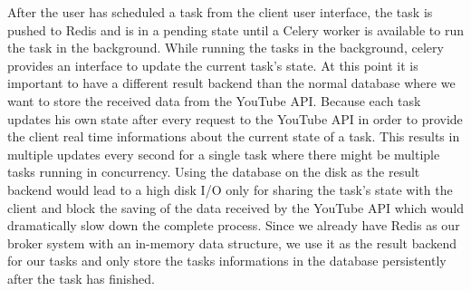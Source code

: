 After the user has scheduled a task from the client user interface, the task is pushed to Redis and is in a pending state until a Celery worker is available to run the task in
the background. While running the tasks in the background, celery provides an interface to update the current task's state. At this point it is important to have a different 
result backend than the normal database where we want to store the received data from the YouTube API. Because each task updates his own state after every request to the YouTube API 
in order to provide the client real time informations about the current state of a task. This results in multiple updates every second for a single task where there 
might be multiple tasks running in concurrency. Using the database on the disk as the result backend would lead to a high
disk I/O only for sharing the task's state with the client and block the saving of the data received by the YouTube API which would dramatically slow down the complete process.
Since we already have Redis as our broker system with an in-memory data structure, we use it as the result backend for our tasks and only store the tasks informations 
in the database persistently after the task has finished.







